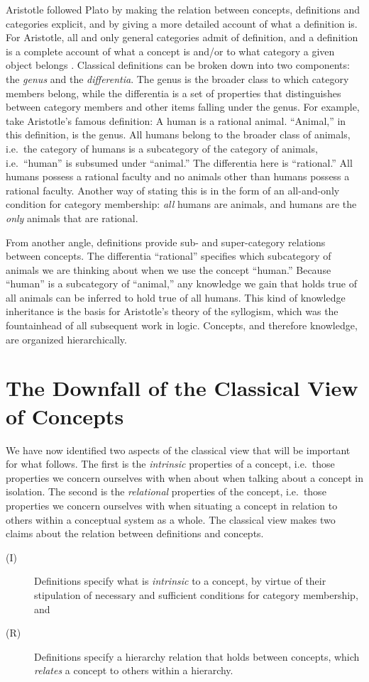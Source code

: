 Aristotle followed Plato by making the relation between concepts, definitions and categories explicit, and by giving a more detailed account of what a definition is. For Aristotle, all and only general categories admit of definition, and a definition is a complete account of what a concept is and/or to what category a given object belongs \cite{aristotle_categories} \cite{aristotle_metaphysics}. Classical definitions can be broken down into two components: the \emph{genus} and the \emph{differentia}. The genus is the broader class to which category members belong, while the differentia is a set of properties that distinguishes between category members and other items falling under the genus. For example, take Aristotle's famous definition: A human is a rational animal. ``Animal,'' in this definition, is the genus. All humans belong to the broader class of animals, i.e.\ the category of humans is a subcategory of the category of animals, i.e.\ ``human'' is subsumed under ``animal.'' The differentia here is ``rational.'' All humans possess a rational faculty and no animals other than humans possess a rational faculty. Another way of stating this is in the form of an all-and-only condition for category membership: \emph{all} humans are animals, and humans are the \emph{only} animals that are rational.

From another angle, definitions provide sub- and super-category relations between concepts. The differentia ``rational'' specifies which subcategory of animals we are thinking about when we use the concept ``human.'' Because ``human'' is a subcategory of ``animal,'' any knowledge we gain that holds true of all animals can be inferred to hold true of all humans. This kind of knowledge inheritance is the basis for Aristotle's theory of the syllogism, which was the fountainhead of all subsequent work in logic. Concepts, and therefore knowledge, are organized hierarchically.

\section{The Downfall of the Classical View of Concepts}

We have now identified two aspects of the classical view that will be important for what follows. The first is the \emph{intrinsic} properties of a concept, i.e.\ those properties we concern ourselves with when about when talking about a concept in isolation. The second is the \emph{relational} properties of the concept, i.e.\ those properties we concern ourselves with when situating a concept in relation to others within a conceptual system as a whole.  The classical view makes two claims about the relation between definitions and concepts.
\begin{description}
\item[(I)] Definitions specify what is \emph{intrinsic} to a concept, by virtue of their stipulation of necessary and sufficient conditions for category membership, and
\item[(R)] Definitions specify a hierarchy relation that holds between concepts, which \emph{relates} a concept to others within a hierarchy.
\end{description}

